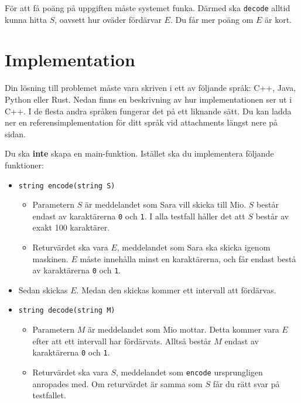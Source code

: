 För att få poäng på uppgiften måste systemet funka. Därmed ska \texttt{decode} alltid
kunna hitta $S$, oavsett hur oväder fördärvar $E$. Du får mer poäng om $E$ är kort.

\section*{Implementation}
Din lösning till problemet måste vara skriven i ett av följande språk: C++, Java, Python eller Rust.
Nedan finns en beskrivning av hur implementationen ser ut i C++. I de flesta andra språken
fungerar det på ett liknande sätt. Du kan ladda ner en referensimplementation för ditt språk vid attachments
längst nere på sidan.

Du ska \textbf{inte} skapa en main-funktion. Istället ska du implementera följande funktioner:\\

\begin{itemize}
  \item \texttt{string encode(string S)}\\
  \begin{itemize}
    \item Parametern $S$ är meddelandet som Sara vill skicka till Mio. $S$ består
    endast av karaktärerna \texttt{0} och \texttt{1}. I alla testfall håller det att
    $S$ består av exakt 100 karaktärer.
    \item Returvärdet ska vara $E$, meddelandet som Sara ska skicka igenom maskinen. $E$
    måste innehålla minst en karaktärerna, och får endast bestå av karaktärerna \texttt{0} och \texttt{1}.
  \end{itemize}

  \item Sedan skickas $E$. Medan den skickas kommer ett intervall att fördärvas.

  \item \texttt{string decode(string M)}\\
  \begin{itemize}
    \item Parametern $M$ är meddelandet som Mio mottar. Detta kommer vara $E$
    efter att ett intervall har fördärvats. Alltså består $M$
    endast av karaktärerna \texttt{0} och \texttt{1}.
    \item Returvärdet ska vara $S$, meddelandet som \texttt{encode} ursprungligen anropades med. Om
    returvärdet är samma som $S$ får du rätt svar på testfallet.
  \end{itemize}
\end{itemize}


